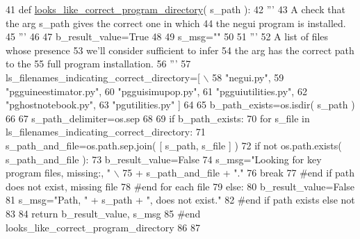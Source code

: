 \begin{DoxyCode}
41 \textcolor{keyword}{def }\hyperlink{namespacenegui_1_1setup__negui__environment_a3dc373e848bd3191a1850e9885990e55}{looks\_like\_correct\_program\_directory}( s\_path ):
42     \textcolor{stringliteral}{'''}
43 \textcolor{stringliteral}{    A check that the arg s\_path gives the correct one in which}
44 \textcolor{stringliteral}{    the negui program is installed.}
45 \textcolor{stringliteral}{    '''}
46 
47     b\_result\_value=\textcolor{keyword}{True}
48 
49     s\_msg=\textcolor{stringliteral}{""}
50 
51     \textcolor{stringliteral}{'''}
52 \textcolor{stringliteral}{    A list of files whose presence}
53 \textcolor{stringliteral}{    we'll consider sufficient to infer}
54 \textcolor{stringliteral}{    the arg has the correct path to the}
55 \textcolor{stringliteral}{    full program installation.}
56 \textcolor{stringliteral}{    '''}
57     ls\_filenames\_indicating\_correct\_directory=[ \(\backslash\)
58                                         \textcolor{stringliteral}{"negui.py"},
59                                         \textcolor{stringliteral}{"pgguineestimator.py"},
60                                         \textcolor{stringliteral}{"pgguisimupop.py"},
61                                         \textcolor{stringliteral}{"pgguiutilities.py"},
62                                         \textcolor{stringliteral}{"pghostnotebook.py"},
63                                         \textcolor{stringliteral}{"pgutilities.py"} ]
64 
65     b\_path\_exists=os.isdir( s\_path )
66 
67     s\_path\_delimiter=os.sep
68 
69     \textcolor{keywordflow}{if} b\_path\_exists:
70         \textcolor{keywordflow}{for} s\_file \textcolor{keywordflow}{in} ls\_filenames\_indicating\_correct\_directory:
71             s\_path\_and\_file=os.path.sep.join( [ s\_path, s\_file ] )
72             \textcolor{keywordflow}{if} \textcolor{keywordflow}{not} os.path.exists( s\_path\_and\_file ):
73                 b\_result\_value=\textcolor{keyword}{False}
74                 s\_msg=\textcolor{stringliteral}{"Looking for key program files, missing:, "} \(\backslash\)
75                                                 + s\_path\_and\_file + \textcolor{stringliteral}{"."}
76                 \textcolor{keywordflow}{break}
77             \textcolor{comment}{#end if path does not exist, missing file}
78         \textcolor{comment}{#end for each file }
79     \textcolor{keywordflow}{else}:
80         b\_result\_value=\textcolor{keyword}{False}
81         s\_msg=\textcolor{stringliteral}{"Path, "} + s\_path + \textcolor{stringliteral}{", does not exist."}
82     \textcolor{comment}{#end if path exists else not}
83 
84     \textcolor{keywordflow}{return} b\_result\_value, s\_msg
85 \textcolor{comment}{#end looks\_like\_correct\_program\_directory}
86 
87 
\end{DoxyCode}
